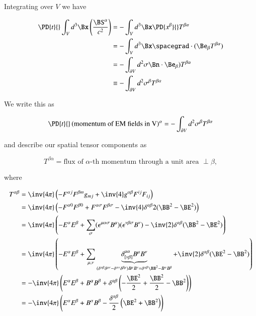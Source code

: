 Integrating over $V$ we have

\begin{align*}
\PD{t}{} \int_V d^3\Bx \left( \frac{\BS^{\alpha}}{c^2} \right) 
&= -\int_V d^3\Bx \PD{x^\beta}{} T^{\beta \alpha} \\
&= -\int_V d^3\Bx \spacegrad \cdot (\Be_\beta T^{\beta \alpha}) \\
&= -\int_{\partial V} d^2 \sigma \Bn \cdot \Be_\beta) T^{\beta \alpha} \\
&\equiv -\int_{\partial V} d^2 \sigma^\beta T^{\beta \alpha} \\
\end{align*}

We write this as

\begin{equation}\label{eqn:relativisticElectrodynamicsL23:190}
\PD{t}{} \left( \text{momentum of EM fields in V} \right)^\alpha = - \int_{\partial V} d^2 \sigma^\beta T^{\beta \alpha}
\end{equation}

and describe our spatial tensor components as

\begin{equation}\label{eqn:relativisticElectrodynamicsL23:210}
T^{\beta\alpha} = \text{flux of $\alpha$-th momentum through a unit area $\perp \beta$},
\end{equation}

where

\begin{align*}
T^{\alpha\beta} 
&= \inv{4\pi} \left( -F^{\alpha j} F^{\beta m} g_{m j} + \inv{4} g^{\alpha\beta} F^{ij}F_{ij} \right) \\
&= \inv{4\pi} \left( 
-F^{\alpha 0} F^{\beta 0} 
+F^{\alpha \sigma} F^{\beta \sigma} 
- \inv{4} \delta^{\alpha\beta} 2 (\BB^2 - \BE^2) \right) \\
&= \inv{4\pi} \left( 
-E^\alpha E^\beta
+\sum_\sigma 
(\epsilon^{\mu\alpha\sigma} B^\mu)
(\epsilon^{\nu\beta\sigma} B^\nu)
- \inv{2} \delta^{\alpha\beta} (\BB^2 - \BE^2) \right) \\
&= \inv{4\pi} \left( 
-E^\alpha E^\beta
+\sum_{\mu,\nu} \underbrace{\delta^{\mu\alpha}_{[\nu\beta]}
B^\mu B^\nu
}_{
(\delta^{\alpha \beta} \delta^{\mu \nu} - \delta^{\alpha \nu} \delta^{\beta \mu} ) 
B^\mu B^\nu
=
\delta^{\alpha\beta}\BB^2 - B^\alpha B^\beta
} 
+ \inv{2} \delta^{\alpha\beta} (\BE^2 - \BB^2) \right) \\
&=
- \inv{4\pi} \left(
E^\alpha E^\beta
+B^\alpha B^\beta
+ \delta^{\alpha\beta} 
\left(
-\frac{\BE^2}{2} + \frac{\BB^2}{2} - \BB^2 \right)
\right) \\
&=
- \inv{4\pi} \left(
E^\alpha E^\beta
+B^\alpha B^\beta
- \frac{\delta^{\alpha\beta} }{2}
\left(
\BE^2 + \BB^2 
\right)
\right) \\
\end{align*}

